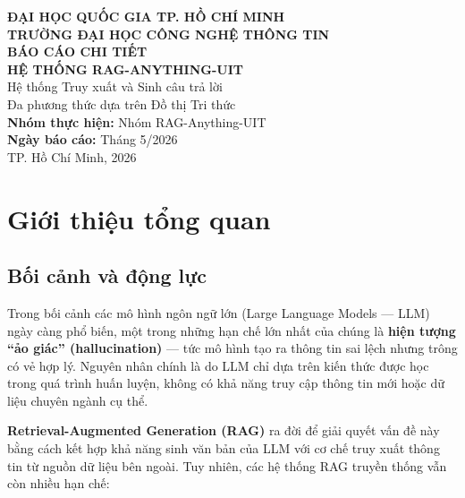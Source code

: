 \documentclass[12pt,a4paper]{article}
\begin{document}
\begin{titlepage}
\centering
\vspace*{2cm}

{\Large\textbf{ĐẠI HỌC QUỐC GIA TP. HỒ CHÍ MINH}}\\[0.3cm]
{\Large\textbf{TRƯỜNG ĐẠI HỌC CÔNG NGHỆ THÔNG TIN}}\\[2.5cm]

{\Huge\bfseries BÁO CÁO CHI TIẾT}\\[0.5cm]
{\Huge\bfseries HỆ THỐNG RAG-ANYTHING-UIT}\\[1cm]

{\Large Hệ thống Truy xuất và Sinh câu trả lời\\Đa phương thức dựa trên Đồ thị Tri thức}\\[3cm]

{\large\textbf{Nhóm thực hiện:} Nhóm RAG-Anything-UIT}\\[0.5cm]
{\large\textbf{Ngày báo cáo:} Tháng 5/2026}\\[3cm]

\vfill
{\large TP. Hồ Chí Minh, 2026}
\end{titlepage}

\newpage
\tableofcontents
\newpage

\section{Giới thiệu tổng quan}

\subsection{Bối cảnh và động lực}

Trong bối cảnh các mô hình ngôn ngữ lớn (Large Language Models --- LLM) ngày càng phổ biến, một trong những hạn chế lớn nhất của chúng là \textbf{hiện tượng ``ảo giác'' (hallucination)} --- tức mô hình tạo ra thông tin sai lệch nhưng trông có vẻ hợp lý. Nguyên nhân chính là do LLM chỉ dựa trên kiến thức được học trong quá trình huấn luyện, không có khả năng truy cập thông tin mới hoặc dữ liệu chuyên ngành cụ thể.

\textbf{Retrieval-Augmented Generation (RAG)} ra đời để giải quyết vấn đề này bằng cách kết hợp khả năng sinh văn bản của LLM với cơ chế truy xuất thông tin từ nguồn dữ liệu bên ngoài. Tuy nhiên, các hệ thống RAG truyền thống vẫn còn nhiều hạn chế:
\end{document}
